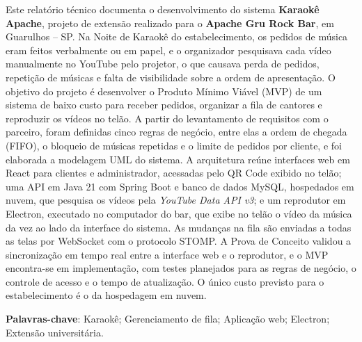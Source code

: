 \begin{resumo}
Este relatório técnico documenta o desenvolvimento do sistema \textbf{Karaokê Apache}, projeto de extensão realizado para o \textbf{Apache Gru Rock Bar}, em Guarulhos -- SP. Na Noite de Karaokê do estabelecimento, os pedidos de música eram feitos verbalmente ou em papel, e o organizador pesquisava cada vídeo manualmente no YouTube pelo projetor, o que causava perda de pedidos, repetição de músicas e falta de visibilidade sobre a ordem de apresentação. O objetivo do projeto é desenvolver o Produto Mínimo Viável (MVP) de um sistema de baixo custo para receber pedidos, organizar a fila de cantores e reproduzir os vídeos no telão. A partir do levantamento de requisitos com o parceiro, foram definidas cinco regras de negócio, entre elas a ordem de chegada (FIFO), o bloqueio de músicas repetidas e o limite de pedidos por cliente, e foi elaborada a modelagem UML do sistema. A arquitetura reúne interfaces web em React para clientes e administrador, acessadas pelo QR Code exibido no telão; uma API em Java 21 com Spring Boot e banco de dados MySQL, hospedados em nuvem, que pesquisa os vídeos pela \textit{YouTube Data API v3}; e um reprodutor em Electron, executado no computador do bar, que exibe no telão o vídeo da música da vez ao lado da interface do sistema. As mudanças na fila são enviadas a todas as telas por WebSocket com o protocolo STOMP. A Prova de Conceito validou a sincronização em tempo real entre a interface web e o reprodutor, e o MVP encontra-se em implementação, com testes planejados para as regras de negócio, o controle de acesso e o tempo de atualização. O único custo previsto para o estabelecimento é o da hospedagem em nuvem.

\vspace{\onelineskip}
\noindent
\textbf{Palavras-chave}: Karaokê; Gerenciamento de fila; Aplicação web; Electron; Extensão universitária.
\end{resumo}
